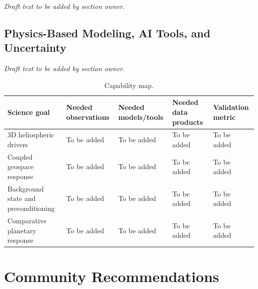 \documentclass[
  draft
]{agujournal2025}
\begin{document}
\noindent\textit{Draft text to be added by section owner.}

\subsection{Physics-Based Modeling, AI Tools, and Uncertainty}

\noindent\textit{Draft text to be added by section owner.}

\begin{table}[h]
\caption{Capability map.}
\label{tab:capability-map}
\centering
\begin{tabular}{p{} p{} p{} p{} p{}}
\hline
Science goal & Needed observations & Needed models/tools & Needed data products & Validation metric \\
\hline
3D heliospheric drivers & To be added & To be added & To be added & To be added \\
Coupled geospace response & To be added & To be added & To be added & To be added \\
Background state and preconditioning & To be added & To be added & To be added & To be added \\
Comparative planetary response & To be added & To be added & To be added & To be added \\
\hline
\end{tabular}
\end{table}

\section{Community Recommendations}
\end{document}
